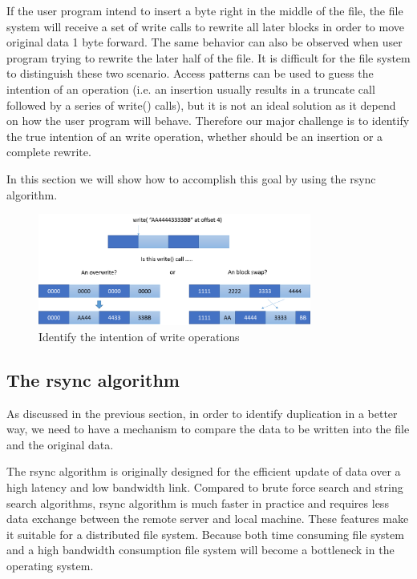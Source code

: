     If the user program intend to insert a byte right in the middle of the file, the file system will receive a set of write calls to rewrite all later blocks in order to move original data 1 byte forward. The same behavior can also be observed when user program trying to rewrite the later half of the file. It is difficult for the file system to distinguish these two scenario. Access patterns can be used to guess the intention of an operation (i.e. an insertion usually results in a truncate call followed by a series of write() calls), but it is not an ideal solution as it depend on how the user program will behave. Therefore our major challenge is to identify the true intention of an write operation, whether should be an insertion or a complete rewrite.

    In this section we will show how to accomplish this goal by using the rsync algorithm.

\begin{figure}[hbtp]
\centering
\includegraphics[width=0.8\textwidth]{Chapter-4/figs/fig6.png}
\caption{Identify the intention of write operations}
\label{fig:write_intention}
\end{figure}

\subsection{The rsync algorithm}

    As discussed in the previous section, in order to identify duplication in a better way, we need to have a mechanism to compare the data to be written into the file and the original data. 
    
    The rsync algorithm is originally designed for the efficient update of data over a high latency and low bandwidth link. Compared to brute force search and string search algorithms, rsync algorithm is much faster in practice and requires less data exchange between the remote server and local machine. These features make it suitable for a distributed file system. Because both time consuming file system and a high bandwidth consumption file system will become a bottleneck in the operating system.

